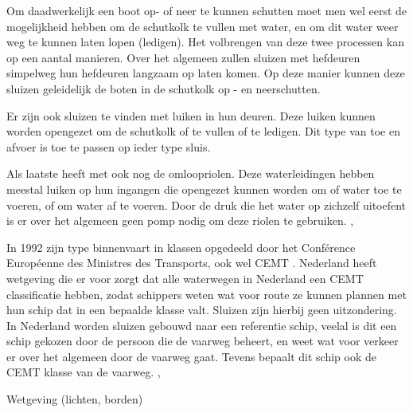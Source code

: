 \documentclass[../verslag.tex]{subfiles}
\begin{document}
Om daadwerkelijk een boot op- of neer te kunnen schutten moet men wel eerst de mogelijkheid hebben om de schutkolk te vullen met water, en om dit water weer weg te kunnen laten lopen (ledigen). Het volbrengen van deze twee processen kan op een aantal manieren. Over het algemeen zullen sluizen met hefdeuren simpelweg hun hefdeuren langzaam op laten komen. Op deze manier kunnen deze sluizen geleidelijk de boten in de schutkolk op - en neerschutten. \cite{bezuijen_2000}

Er zijn ook sluizen te vinden met luiken in hun deuren. Deze luiken kunnen worden opengezet om de schutkolk of te vullen of te ledigen. Dit type van toe en afvoer is toe te passen op ieder type sluis. \cite{bezuijen_2000}

Als laatste heeft met ook nog de omloopriolen. Deze waterleidingen hebben meestal luiken op hun ingangen die opengezet kunnen worden om of water toe te voeren, of om water af te voeren. Door de druk die het water op zichzelf uitoefent is er over het algemeen geen pomp nodig om deze riolen te gebruiken. \cite{gww_2020}, \cite{bezuijen_2000}

In 1992 zijn type binnenvaart in klassen opgedeeld door het Conférence Européenne des Ministres des Transports, ook wel CEMT \cite{cemt_1992}. Nederland heeft wetgeving die er voor zorgt dat alle waterwegen in Nederland een CEMT classificatie hebben, zodat schippers weten wat voor route ze kunnen plannen met hun schip dat in een bepaalde klasse valt. Sluizen zijn hierbij geen uitzondering. In Nederland worden sluizen gebouwd naar een referentie schip, veelal is dit een schip gekozen door de persoon die de vaarweg beheert, en weet wat voor verkeer er over het algemeen door de vaarweg gaat. Tevens bepaalt dit schip ook de CEMT klasse van de vaarweg. \cite{cemt_1992}, \cite{rws_2020}

Wetgeving (lichten, borden)
\end{document}
